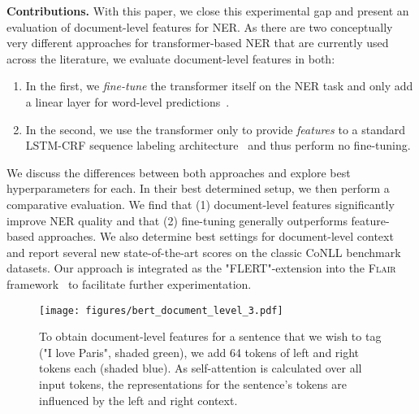 \documentclass[11pt,a4paper]{article}
\begin{document}
\noindent
\textbf{Contributions.}
With this paper, we close this experimental gap and present an evaluation of document-level features for NER. As there are two conceptually very different approaches for transformer-based NER that are currently used across the literature, we evaluate document-level features in both: 

\begin{enumerate}
\vspace{-1mm}
    \item In the first, we \textit{fine-tune} the transformer itself on the NER task and only add a linear layer for word-level predictions~\cite{devlin-etal-2019-bert}.
\vspace{-1mm}
    \item In the second, we use the transformer only to provide \textit{features} to a standard LSTM-CRF sequence labeling architecture~\cite{2015arXiv150801991H} and thus perform no fine-tuning.
\end{enumerate}
\vspace{-1mm}
We discuss the differences between both approaches and explore best hyperparameters for each. In their best determined setup, we then perform a comparative evaluation.
We find that (1) document-level features significantly improve NER quality and that (2) fine-tuning generally outperforms feature-based approaches. We also determine best settings for document-level context and report several new state-of-the-art scores on the classic CoNLL benchmark datasets. Our approach is integrated as the "FLERT"-extension into the \textsc{Flair} framework~\cite{akbik-etal-2019-flair} to facilitate further experimentation.


















\begin{figure*}
\vspace{-3mm}
 \centering
 \texttt{[image: figures/bert\_document\_level\_3.pdf]}
\vspace{-7mm}
 \caption{To obtain document-level features for a sentence that we wish to tag ("I love Paris", shaded green), we add 64 tokens of left and right tokens each (shaded blue). As self-attention is calculated over all input tokens, the representations for the sentence's tokens are influenced by the left and right context.}
\vspace{-3mm}
 \label{overview-bert-fine-tuning-document-level}
\end{figure*}
\end{document}
